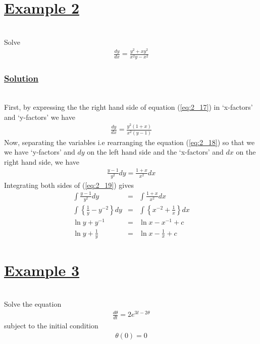 \documentclass[11pt]{report}
\newcommand{\ubt}[1]{\textbf{\underline{#1}}}
\newcommand{\sps}{\\[0.2cm]}
\newcommand{\spn}[1]{\\[#1cm]}
\newcommand{\refn}[1]{(\ref{#1})}
\newcommand{\refx}[1]{\refn{eq:#1}}
\newcommand{\example}[1]{\section*{\ubt{Example #1}}{~}\spn{-1}}
\newcommand{\solution}{\subsubsection{\ubt{Solution}}{~}\spn{-1}}
\begin{document}
	\example{2}
	Solve\spn{-1.3}
	\begin{eqnarray}
		\frac{dy}{dx} = \frac{y^2 + xy^2}{x^2y - x^2}\label{eq:2_17}
	\end{eqnarray}
	
	\solution
	First, by expressing the the right hand side of equation \refx{2_17} in `x-factors' and `y-factors' we have
	\begin{eqnarray}
		\frac{dy}{dx} = \frac{y^2(1+x)}{x^2(y-1)}\label{eq:2_18}
	\end{eqnarray}
	Now, separating the variables i.e rearranging the equation \refx{2_18} so that we we have `y-factors' and $dy$ on the left hand side and the `x-factors' and $dx$ on the right hand side, we have
	\begin{eqnarray}
		\frac{y-1}{y^2}dy = \frac{1+x}{x^2}dx\label{eq:2_19}
	\end{eqnarray}
	Integrating both sides of \refx{2_19} gives
	\begin{eqnarray*}
		\int\frac{y-1}{y^2}dy &=& \int\frac{1+x}{x^2}dx\sps
		\int\left\{\frac{1}{y} - y^{-2}\right\}dy &=& \int\left\{x^{-2} + \frac{1}{x}\right\}dx\sps
		\ln y + y^{-1} &=& \ln x - x^{-1} + c\sps
		\ln y + \frac{1}{y} &=& \ln x - \frac{1}{x} + c
	\end{eqnarray*}
	
	\example{3}
	Solve the equation\spn{-1.2} 
	\begin{eqnarray}
		\frac{d\theta}{dt}=2e^{3t-2\theta}\label{eq:2_20}
	\end{eqnarray}
	subject to the initial condition\spn{-1.2}
	\begin{eqnarray}
		\theta(0) = 0\label{eq:2_21}
	\end{eqnarray}
	{~}\spn{-2}
	
\end{document}
